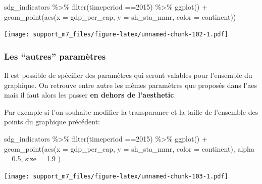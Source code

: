 \documentclass[
]{book}
\newenvironment{Shaded}{\begin{snugshade}}{\end{snugshade}}
\newcommand{\AttributeTok}[1]{\textcolor[rgb]{0.77,0.63,0.00}{#1}}
\newcommand{\DecValTok}[1]{\textcolor[rgb]{0.00,0.00,0.81}{#1}}
\newcommand{\FloatTok}[1]{\textcolor[rgb]{0.00,0.00,0.81}{#1}}
\newcommand{\FunctionTok}[1]{\textcolor[rgb]{0.00,0.00,0.00}{#1}}
\newcommand{\NormalTok}[1]{#1}
\newcommand{\SpecialCharTok}[1]{\textcolor[rgb]{0.00,0.00,0.00}{#1}}
\begin{document}
\begin{Shaded}
\begin{Highlighting}[]
\NormalTok{sdg\_indicators }\SpecialCharTok{\%\textgreater{}\%} 
  \FunctionTok{filter}\NormalTok{(timeperiod }\SpecialCharTok{==}\DecValTok{2015}\NormalTok{) }\SpecialCharTok{\%\textgreater{}\%} 
  \FunctionTok{ggplot}\NormalTok{() }\SpecialCharTok{+}
  \FunctionTok{geom\_point}\NormalTok{(}\FunctionTok{aes}\NormalTok{(}\AttributeTok{x =}\NormalTok{ gdp\_per\_cap, }
                 \AttributeTok{y =}\NormalTok{ sh\_sta\_mmr,}
                 \AttributeTok{color =}\NormalTok{ continent))}
\end{Highlighting}
\end{Shaded}

\texttt{[image: support\_m7\_files/figure-latex/unnamed-chunk-102-1.pdf]}

\hypertarget{les-autres-paramuxe8tres}{%
\subsubsection{Les ``autres'' paramètres}\label{les-autres-paramuxe8tres}}

Il est possible de spécifier des paramètres qui seront valables pour l'ensemble du graphique.
On retrouve entre autre les mêmes paramètres que proposés dans l'aes mais il faut alors les passer \textbf{en dehors de l'aesthetic}.

Par exemple si l'on souhaite modifier la transparance et la taille de l'ensemble des points du graphique précédent:

\begin{Shaded}
\begin{Highlighting}[]
\NormalTok{sdg\_indicators }\SpecialCharTok{\%\textgreater{}\%} 
  \FunctionTok{filter}\NormalTok{(timeperiod }\SpecialCharTok{==}\DecValTok{2015}\NormalTok{) }\SpecialCharTok{\%\textgreater{}\%} 
  \FunctionTok{ggplot}\NormalTok{() }\SpecialCharTok{+}
  \FunctionTok{geom\_point}\NormalTok{(}\FunctionTok{aes}\NormalTok{(}\AttributeTok{x =}\NormalTok{ gdp\_per\_cap, }
                 \AttributeTok{y =}\NormalTok{ sh\_sta\_mmr,}
                 \AttributeTok{color =}\NormalTok{ continent),}
    \AttributeTok{alpha =} \FloatTok{0.5}\NormalTok{, }
    \AttributeTok{size =} \FloatTok{1.9}
\NormalTok{  )}
\end{Highlighting}
\end{Shaded}

\texttt{[image: support\_m7\_files/figure-latex/unnamed-chunk-103-1.pdf]}
\end{document}
